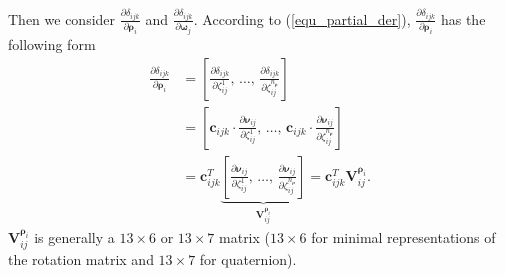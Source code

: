 \documentclass{vgtc}                          %
\begin{document}
Then we consider $\frac{\partial \delta_{ijk} }{\partial \bm{\rho}_{i}}$  and $\frac{\partial \delta_{ijk} }{\partial \bm{\omega}_j}$. %
According to (\ref{equ_partial_der}), $\frac{\partial \delta_{ijk} }{\partial \bm{\rho}_{i}}$ has the following form
\begin{equation} \label{equ_d_rho}
	\begin{split}
		\frac{\partial \delta_{ijk} }{\partial {\bm{\rho}}_{i}} & = \left[ 
		\frac{\partial \delta_{ijk} }{\partial \zeta_{ij}^{1}}, \, \dots, \, \frac{\partial \delta_{ijk} }{\partial \zeta_{ij}^{n_{\bm{\rho}}}}
		\right] \\
		& = \left[ \mathbf{c}_{ijk} \cdot \frac{\partial \bm{\nu}_{ij}}{\partial \zeta_{ij}^{1}}, \, \dots, \,   \mathbf{c}_{ijk} \cdot \frac{\partial \bm{\nu}_{ij}}{\partial \zeta_{ij}^{n_{\bm{\rho}}}} 
		\right] \\
		& = \mathbf{c}_{ijk}^{T}\underbrace{\left[  \frac{\partial \bm{\nu}_{ij}}{\partial \zeta_{ij}^{1}}, \, \dots, \,  \frac{\partial \bm{\nu}_{ij}}{\partial \zeta_{ij}^{n_{\bm{\rho}}}} 
		\right]}_{\bm{V}^{{\bm{\rho}}_{i}}_{ij}}
		 = \mathbf{c}_{ijk}^{T}\bm{V}^{{\bm{\rho}}_{i}}_{ij}.
	\end{split}
\end{equation}
$\bm{V}^{{\bm{\rho}}_{i}}_{ij}$ is generally a $13 \times 6$ or  $13 \times 7$ matrix ($13 \times 6$ for  minimal representations of the rotation matrix and $13 \times 7$  for quaternion). 
\end{document}
